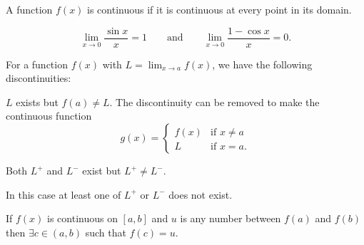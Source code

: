 \documentclass[10pt, a4paper]{article}
\begin{document}
\begin{definition}[Continuity]
    A function $f(x)$ is continuous if it is continuous at every point in its domain.
\end{definition}

\begin{proposition}
    \[
    \lim_{x \rightarrow 0}\frac{\sin{x}}{x} = 1\qquad\text{and}\qquad\lim_{x \rightarrow 0}\frac{1 - \cos{x}}{x} = 0.
    \]
\end{proposition}

For a function $f(x)$ with $L = \lim_{x \rightarrow a}f(x)$,
we have the following discontinuities:

\begin{definition}
    $L$ exists but $f(a) \neq L$.
    The discontinuity can be removed to make the continuous function
    \[
    g(x) = \begin{cases}
        f(x) & \text{if } x \neq a \\
        L & \text{if } x = a.
    \end{cases}
    \]
\end{definition}

\begin{center}
\end{center}
\hfill

\begin{definition}
    Both $L ^ {+}$ and $L ^ {-}$ exist but $L ^ {+} \neq L ^ {-}$.
\end{definition}

\begin{definition}
    In this case at least one of $L ^ {+}$ or $L ^ {-}$ does not exist.
\end{definition}

\begin{theorem}
    If $f(x)$ is continuous on $[a, b]$ and $u$ is any number between $f(a)$ and $f(b)$ then $\exists c \in (a, b)$ such that $f(c) = u$.
\end{theorem}
\end{document}
